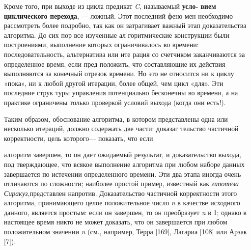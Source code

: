 Кроме того, при выходе из цикла предикат \textit{C}, называемый \textbf{усло­-}
\textbf{вием  циклического  перехода},  — ложный.  Этот последний  фено­
мен необходимо рассмотреть более подробно, так как он затрагивает 
важный этап доказательства алгоритма. До сих пор все изученные ал­
горитмические конструкции были построениями, выполнение которых 
ограничивалось во времени: последовательность, альтернатива или ите­
рация со счетчиком заканчиваются за определенное время, если пред­
положить,  что составляющие  их действия  выполняются за конечный 
отрезок времени. Но это не относится ни к циклу «пока», ни к любой 
другой итерации, более общей, чем цикл «для». Эти последние струк­
туры управления потенциально бесконечны во времени, а на практике 
ограничены только проверкой условий выхода (когда они есть!).

Таким образом,  обоснование  алгоритма, в  котором представлены 
одна  или  несколько  итераций,  должно содержать  две  части:  доказаг 
тельство частичной корректности, цель которого— показать, что если
\pagebreak

\noindent алгоритм  завершен,  то  он  дает  ожидаемый 
результат,  и  доказательство  выхода,  под­
тверждающее,  что  всякое  выполнение  алго­ритма при любом наборе данных завершает­ся по истечении определенного времени. Эти 
									два этапа иногда очень отличаются по слож­ности;  наиболее  простой  пример,  известный 
									как \textit{гипотеза  Сиракуз},представлен  напро­тив. Доказательство  частичной  корректно­сти
									  этого  алгоритма,  принимающего  целое  положительное  число \textit{n} в 
качестве  исходного данного,  является  простым:  если  он  завершен,  то 
он преобразует \textit{n} в  1; однако в настоящее время никто не может 
дока­зать,  что он завершается  при любом  положительном значении \textit{n} (см., 
например, Терра  [169], Лагариа [108]  или Арзак  [7]).

